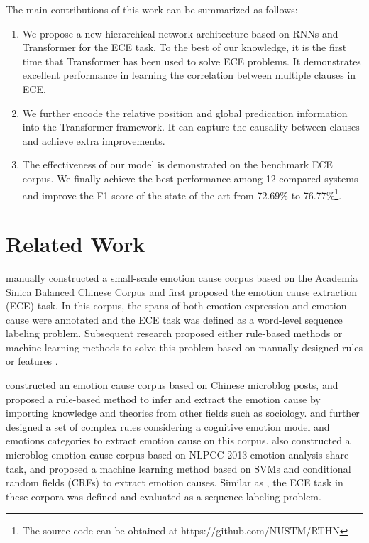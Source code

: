 \documentclass{article}
\begin{document}
The main contributions of this work can be summarized as follows:
\begin{enumerate}
\item We propose a new hierarchical network architecture based on RNNs and Transformer for the ECE task. To the best of our knowledge, it is the first time that Transformer has been used to solve ECE problems. It demonstrates excellent performance in learning the correlation between multiple clauses in ECE.
\item We further encode the relative position and global predication information into the Transformer framework. It can capture the causality between clauses and achieve extra improvements.
\item The effectiveness of our model is demonstrated on the benchmark ECE corpus. We finally achieve the best performance among 12 compared systems and improve the F1 score of the state-of-the-art from 72.69\% to 76.77\%\footnote{The source code can be obtained at https://github.com/NUSTM/RTHN}.
\end{enumerate}



\section{Related Work}
\cite{lee2010text} manually constructed a small-scale emotion cause corpus based on the Academia Sinica Balanced Chinese Corpus and first proposed the emotion cause extraction (ECE) task. In this corpus, the spans of both emotion expression and emotion cause were annotated and the ECE task was defined as a word-level sequence labeling problem. Subsequent research proposed either rule-based methods or machine learning methods to solve this problem based on manually designed rules or features \cite{chen2010emotion,lee2013detecting}. 

\cite{li2014text} constructed an emotion cause corpus based on Chinese microblog posts, and proposed a rule-based method to infer and extract the emotion cause by importing knowledge and theories from other fields such as sociology. \cite{gao2015emotion} and \cite{gao2015rule} further designed a set of complex rules considering a cognitive emotion model and emotions categories to extract emotion cause on this corpus. \cite{gui2014emotion} also constructed a microblog emotion cause corpus based on NLPCC 2013 emotion analysis share task, and proposed a machine learning method based on SVMs and conditional random fields (CRFs) to extract emotion causes. Similar as \cite{lee2010text}, the ECE task in these corpora was defined and evaluated as a sequence labeling problem.
\end{document}
